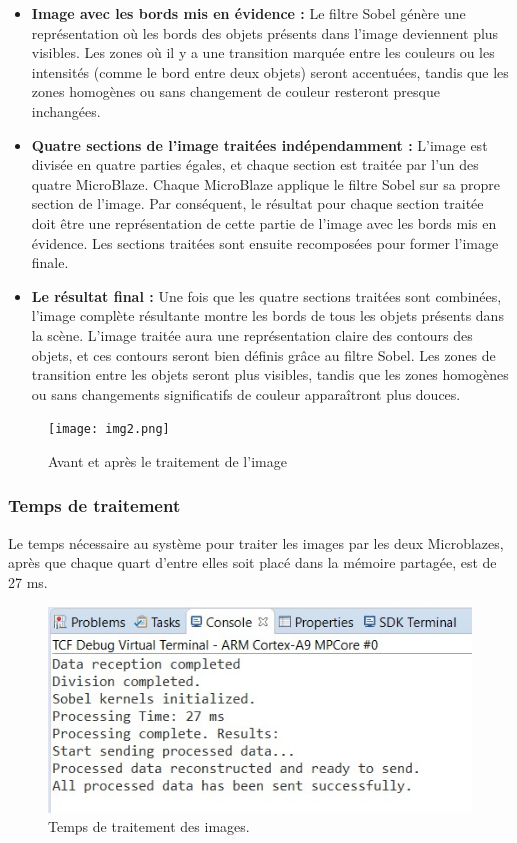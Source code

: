 \documentclass[../CSC_5RO07_TA.tex]{subfiles}
\begin{document}
\begin{itemize}
    \item \textbf{Image avec les bords mis en évidence :} Le filtre Sobel génère une représentation où les bords des objets présents dans l'image deviennent plus visibles. Les zones où il y a une transition marquée entre les couleurs ou les intensités (comme le bord entre deux objets) seront accentuées, tandis que les zones homogènes ou sans changement de couleur resteront presque inchangées.
    
    \item \textbf{Quatre sections de l'image traitées indépendamment :} L'image est divisée en quatre parties égales, et chaque section est traitée par l'un des quatre MicroBlaze. Chaque MicroBlaze applique le filtre Sobel sur sa propre section de l'image. Par conséquent, le résultat pour chaque section traitée doit être une représentation de cette partie de l'image avec les bords mis en évidence. Les sections traitées sont ensuite recomposées pour former l'image finale.
    
    \item \textbf{Le résultat final :} Une fois que les quatre sections traitées sont combinées, l'image complète résultante montre les bords de tous les objets présents dans la scène. L'image traitée aura une représentation claire des contours des objets, et ces contours seront bien définis grâce au filtre Sobel. Les zones de transition entre les objets seront plus visibles, tandis que les zones homogènes ou sans changements significatifs de couleur apparaîtront plus douces.
\end{itemize}

\begin{figure}[H]
    \centering
    \texttt{[image: img2.png]}
    \caption{Avant et après le traitement de l’image}
    \label{fig:5}
\end{figure}

\subsubsection{Temps de traitement}

Le temps nécessaire au système pour traiter les images par les deux Microblazes, après que chaque quart d'entre elles soit placé dans la mémoire partagée, est de 27 ms.

\begin{figure}[H]
    \centering
    \includegraphics[width=0.5\columnwidth]{./images/Resutlado.jpg}
    \caption{Temps de traitement des images.}
    \label{fig:10}
\end{figure}
\end{document}
